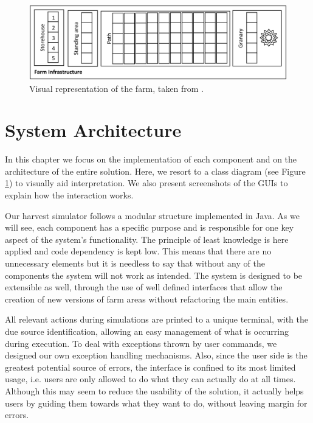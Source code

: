 \documentclass[12pt]{article}
\begin{document}
\begin{figure}[H]
  \centering
  \begin{minipage}{\textwidth}
    \centering
    \includegraphics[width=\linewidth]{FarmSimulation_FarmDesign.png}
  \end{minipage}%
  \caption{Visual representation of the farm, taken from \cite{assign}.}
  \label{class_diagram}
\end{figure} 

\newpage
\section{System Architecture} %

In this chapter we focus on the implementation of each component and on the architecture of the entire solution.
Here, we resort to a class diagram (see Figure \ref{class_diagram}) to visually aid interpretation.
We also present screenshots of the GUIs to explain how the interaction works.

Our harvest simulator follows a modular structure implemented in Java.
As we will see, each component has a specific purpose and is responsible for one key aspect of the system's functionality.
The principle of least knowledge is here applied and code dependency is kept low.
This means that there are no unnecessary elements but it is needless to say that without any of the components the system will not work as intended.
The system is designed to be extensible as well, through the use of well defined interfaces that allow the creation of new versions of farm areas without 
refactoring the main entities.

All relevant actions during simulations are printed to a unique terminal, with the due source identification, allowing an easy management of what is occurring 
during execution.
To deal with exceptions thrown by user commands, we designed our own exception handling mechanisms.
Also, since the user side is the greatest potential source of errors, the interface is confined to its most limited usage, i.e. users are only allowed to do 
what they can actually do at all times.
Although this may seem to reduce the usability of the solution, it actually helps users by guiding them towards what they want to do, without leaving margin for errors.
\end{document}
